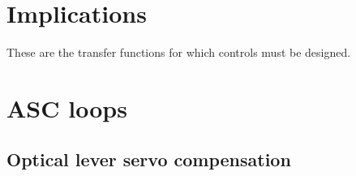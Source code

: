 \section{Implications}
These are the transfer functions for which controls must be designed.




\section{ASC loops}

\subsection{Optical lever servo compensation}



